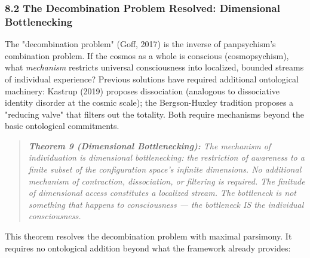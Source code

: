 \subsubsection*{8.2 The Decombination Problem Resolved: Dimensional Bottlenecking}


The "decombination problem" (Goff, 2017) is the inverse of panpsychism's combination problem. If the cosmos as a whole is conscious (cosmopsychism), what \textit{mechanism} restricts universal consciousness into localized, bounded streams of individual experience? Previous solutions have required additional ontological machinery: Kastrup (2019) proposes dissociation (analogous to dissociative identity disorder at the cosmic scale); the Bergson-Huxley tradition proposes a "reducing valve" that filters out the totality. Both require mechanisms beyond the basic ontological commitments.


\begin{quote}
\itshape
\textbf{Theorem 9 (Dimensional Bottlenecking):} \textit{The mechanism of individuation is dimensional bottlenecking: the restriction of awareness to a finite subset of the configuration space's infinite dimensions. No additional mechanism of contraction, dissociation, or filtering is required. The finitude of dimensional access constitutes a localized stream. The bottleneck is not something that happens to consciousness — the bottleneck IS the individual consciousness.}
\end{quote}


This theorem resolves the decombination problem with maximal parsimony. It requires no ontological addition beyond what the framework already provides:


